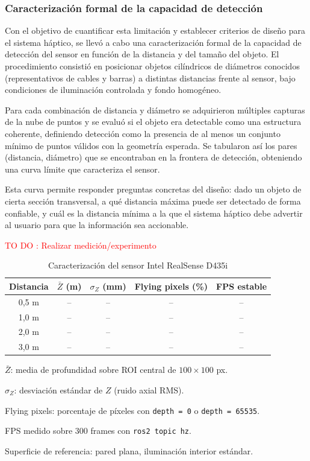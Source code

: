 \subsubsection{Caracterización formal de la capacidad de detección}

Con el objetivo de cuantificar esta limitación y establecer criterios de
diseño para el sistema háptico, se llevó a cabo una caracterización formal
de la capacidad de detección del sensor en función de la distancia y del
tamaño del objeto. El procedimiento consistió en posicionar objetos cilíndricos
de diámetros conocidos (representativos de cables y barras) a distintas
distancias frente al sensor, bajo condiciones de iluminación controlada y
fondo homogéneo.

Para cada combinación de distancia y diámetro se adquirieron múltiples
capturas de la nube de puntos y se evaluó si el objeto era detectable como
una estructura coherente, definiendo detección como la presencia de al menos
un conjunto mínimo de puntos válidos con la geometría esperada. Se tabularon
así los pares (distancia, diámetro) que se encontraban en la frontera de
detección, obteniendo una curva límite que caracteriza el sensor.

Esta curva permite responder preguntas concretas del diseño: dado un objeto
de cierta sección transversal, a qué distancia máxima puede ser detectado de
forma confiable, y cuál es la distancia mínima a la que el sistema háptico
debe advertir al usuario para que la información sea accionable.

{\large\textcolor{red}{TO DO : Realizar medición/experimento}}

\begin{table}[h]
\centering
\caption{Caracterización del sensor Intel RealSense D435i}
\label{tab:d435i_caracterizacion}
\begin{tabular}{ccccc}
\toprule
\textbf{Distancia} & \textbf{$\bar{Z}$ (m)} & \textbf{$\sigma_Z$ (mm)} & \textbf{Flying pixels (\%)} & \textbf{FPS estable} \\
\midrule
0{,}5 m & -- & -- & -- & -- \\
1{,}0 m & -- & -- & -- & -- \\
2{,}0 m & -- & -- & -- & -- \\
3{,}0 m & -- & -- & -- & -- \\
\bottomrule
\end{tabular}
\begin{tablenotes}
  \small
  \item $\bar{Z}$: media de profundidad sobre ROI central de $100 \times 100$ px.
  \item $\sigma_Z$: desviación estándar de $Z$ (ruido axial RMS).
  \item Flying pixels: porcentaje de píxeles con \texttt{depth = 0} o \texttt{depth = 65535}.
  \item FPS medido sobre 300 frames con \texttt{ros2 topic hz}.
  \item Superficie de referencia: pared plana, iluminación interior estándar.
\end{tablenotes}
\end{table}
